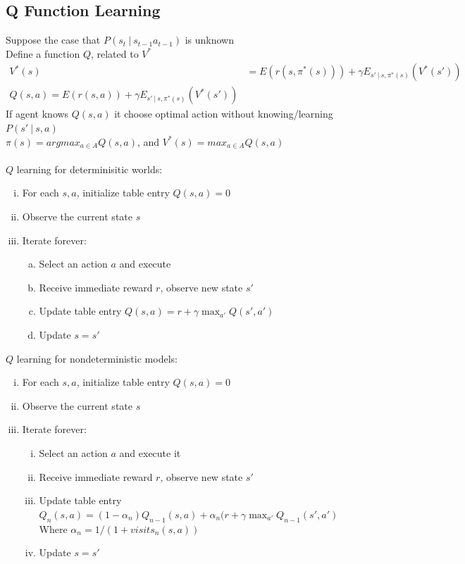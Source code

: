 \documentclass{article}
\begin{document}
		\subsection{Q Function Learning}
			Suppose the case that $P(s_t\:|\:s_{t - 1}a_{t - 1})$ is unknown \\
			Define a function $Q$, related to $V^*$
			\begin{align*}
				V^*(s) &= E(r(s, \pi^*(s))) + \gamma E_{s'\:|\:s, \pi^*(s)}(V^*(s')) \\
				Q(s, a) = E(r(s, a)) + \gamma E_{s'\:|\:s, \pi^*(s)}(V^*(s'))
				\end{align*}
			If agent knows $Q(s, a)$ it choose optimal action without knowing/learning $P(s'\:|\:s, a)$ \\
			$\pi(s) = argmax_{a \in A}Q(s, a)$, and $V^*(s) = max_{a \in A}Q(s, a)$ \\
			\\
			$Q$ learning for determinisitic worlds:
			\begin{enumerate}[(i)]
				\item For each $s, a$, initialize table entry $Q(s, a) = 0$
				\item Observe the current state $s$
				\item Iterate forever:
				\begin{enumerate}[(a)]
					\item Select an action $a$ and execute
					\item Receive immediate reward $r$, observe new state $s'$
					\item Update table entry $Q(s, a) = r + \gamma\max_{a'}Q(s', a')$
					\item Update $s = s'$
					\end{enumerate}
				\end{enumerate}
			$Q$ learning for nondeterministic models:
			\begin{enumerate}[(i)]
				\item For each $s, a$, initialize table entry $Q(s, a) = 0$
				\item Observe the current state $s$
				\item Iterate forever:
				\begin{enumerate}[(i)]
					\item Select an action $a$ and execute it
					\item Receive immediate reward $r$, observe new state $s'$
					\item Update table entry $Q_n(s, a) = (1 - \alpha_n)Q_{n - 1}(s, a) + \alpha_n(r + \gamma\max_{a'}Q_{n - 1}(s', a')$ \\
					Where $\alpha_n = 1/(1 + visits_n(s, a))$
					\item Update $s = s'$
					\end{enumerate}
				\end{enumerate}
\end{document}
